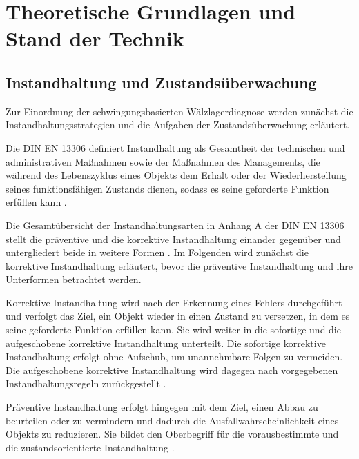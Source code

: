 \chapter{Theoretische Grundlagen und Stand der Technik}
\label{ch:grundlagen}

\section{Instandhaltung und Zustandsüberwachung}
\label{sec:instandhaltung}

Zur Einordnung der schwingungsbasierten Wälzlagerdiagnose werden zunächst die
Instandhaltungsstrategien und die Aufgaben der Zustandsüberwachung erläutert.


Die DIN EN 13306 definiert Instandhaltung als Gesamtheit der technischen und administrativen
Maßnahmen sowie der Maßnahmen des Managements, die während des Lebenszyklus eines Objekts
dem Erhalt oder der Wiederherstellung seines funktionsfähigen Zustands dienen, sodass es seine geforderte Funktion erfüllen kann
\cite[S.~8, Abschn.~2.1]{zotero-item-24}.

Die Gesamtübersicht der Instandhaltungsarten in Anhang A der DIN EN 13306 stellt
die präventive und die korrektive Instandhaltung einander gegenüber und
untergliedert beide in weitere Formen \cite[S.~62, Abb.~A.1]{zotero-item-24}.
Im Folgenden wird zunächst die korrektive Instandhaltung erläutert, bevor die
präventive Instandhaltung und ihre Unterformen betrachtet werden.

Korrektive Instandhaltung wird nach der Erkennung eines Fehlers durchgeführt und verfolgt das
Ziel, ein Objekt wieder in einen Zustand zu versetzen, in dem es seine geforderte Funktion
erfüllen kann. Sie wird weiter in die sofortige und die aufgeschobene korrektive
Instandhaltung unterteilt. Die sofortige korrektive Instandhaltung erfolgt ohne Aufschub, um
unannehmbare Folgen zu vermeiden. Die aufgeschobene korrektive Instandhaltung wird dagegen
nach vorgegebenen Instandhaltungsregeln zurückgestellt
\cite[S.~38, Abschn.~7.9--7.11]{zotero-item-24}.

Präventive Instandhaltung erfolgt hingegen mit dem Ziel, einen Abbau zu beurteilen oder zu
vermindern und dadurch die Ausfallwahrscheinlichkeit eines Objekts zu reduzieren. Sie bildet
den Oberbegriff für die vorausbestimmte und die zustandsorientierte Instandhaltung
\cite[S.~34--35, Abschn.~7.1--7.3]{zotero-item-24}.

